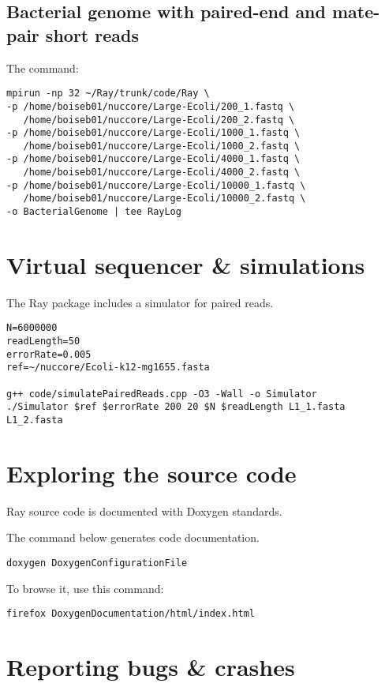 \documentclass{article}
\begin{document}
\subsection{Bacterial genome with paired-end and mate-pair short reads}

The command:

\begin{verbatim}
mpirun -np 32 ~/Ray/trunk/code/Ray \
-p /home/boiseb01/nuccore/Large-Ecoli/200_1.fastq \
   /home/boiseb01/nuccore/Large-Ecoli/200_2.fastq \
-p /home/boiseb01/nuccore/Large-Ecoli/1000_1.fastq \
   /home/boiseb01/nuccore/Large-Ecoli/1000_2.fastq \
-p /home/boiseb01/nuccore/Large-Ecoli/4000_1.fastq \
   /home/boiseb01/nuccore/Large-Ecoli/4000_2.fastq \
-p /home/boiseb01/nuccore/Large-Ecoli/10000_1.fastq \
   /home/boiseb01/nuccore/Large-Ecoli/10000_2.fastq \
-o BacterialGenome | tee RayLog
\end{verbatim}

\section{Virtual sequencer \& simulations}

The Ray package includes a simulator for paired reads.

\begin{verbatim}
N=6000000
readLength=50
errorRate=0.005
ref=~/nuccore/Ecoli-k12-mg1655.fasta

g++ code/simulatePairedReads.cpp -O3 -Wall -o Simulator 
./Simulator $ref $errorRate 200 20 $N $readLength L1_1.fasta L1_2.fasta
\end{verbatim}

\section{Exploring the source code}

Ray source code is documented with Doxygen standards.

The command below generates code documentation.

\begin{verbatim}
doxygen DoxygenConfigurationFile
\end{verbatim}

To browse it, use this command:

\begin{verbatim}
firefox DoxygenDocumentation/html/index.html
\end{verbatim}

\section{Reporting bugs \& crashes}
\end{document}
